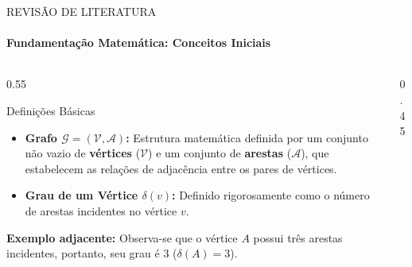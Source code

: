 \documentclass[10pt, aspectratio=169]{beamer}
\begin{document}
\begin{frame}{REVISÃO DE LITERATURA}
  \framesubtitle{Fundamentação Matemática: Conceitos Iniciais}
  
  \begin{columns}
    \begin{column}{0.55\textwidth}
      \begin{block}{Definições Básicas}
        \small
        \begin{itemize}
            \item \textbf{Grafo $\mathcal{G} = (\mathcal{V}, \mathcal{A})$:} Estrutura matemática definida por um conjunto não vazio de \textbf{vértices} ($\mathcal{V}$) e um conjunto de \textbf{arestas} ($\mathcal{A}$), que estabelecem as relações de adjacência entre os pares de vértices.
            \vspace{0.3cm}
            \item \textbf{Grau de um Vértice $\delta(v)$:} Definido rigorosamente como o número de arestas incidentes no vértice $v$.
        \end{itemize}
      \end{block}
      \vspace{0.2cm}
      \small \textbf{Exemplo adjacente:} Observa-se que o vértice $A$ possui três arestas incidentes, portanto, seu grau é 3 ($\delta(A)=3$).
    \end{column}
    
    \begin{column}{0.45\textwidth}
      \begin{center}
      \end{center}
    \end{column}
  \end{columns}
\end{frame}
\end{document}

